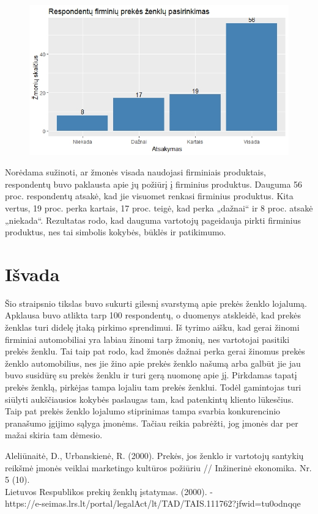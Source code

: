 \documentclass[12pt,titlepage]{article}
\begin{document}
\begin{figure}[H]
\center
\includegraphics[scale=0.8]{plot3}
\end{figure}

Norėdama sužinoti, ar žmonės visada naudojasi firminiais produktais, respondentų buvo paklausta apie jų požiūrį į firminius produktus. Dauguma 56 proc. respondentų atsakė, kad jie visuomet renkasi firminius produktus. Kita vertus, 19 proc.  perka kartais, 17 proc. teigė, kad perka „dažnai“ ir 8 proc. atsakė „niekada“.  Rezultatas rodo, kad dauguma vartotojų pageidauja pirkti firminius produktus, nes tai simbolis kokybės, būklės ir patikimumo.

\justify
\section{Išvada}
\justify
\hspace{\parindent}
Šio straipsnio tikslas buvo sukurti gilesnį svarstymą apie prekės ženklo lojalumą.  Apklausa buvo atlikta tarp 100 respondentų, o duomenys atskleidė, kad prekės ženklas turi didelę įtaką pirkimo sprendimui. Iš tyrimo aišku, kad gerai žinomi firminiai automobiliai yra labiau žinomi tarp žmonių, nes vartotojai pasitiki prekės ženklu. Tai taip pat rodo, kad žmonės dažnai perka gerai žinomus prekės ženklo automobilius, nes jie žino apie prekės ženklo našumą arba galbūt jie jau buvo susidūrę su prekės ženklu ir turi gerą nuomonę apie jį. Pirkdamas tapatį prekės ženklą, pirkėjas tampa lojaliu tam prekės ženklui. Todėl gamintojas turi siūlyti aukščiausios kokybės paslaugas tam, kad patenkintų kliento lūkesčius. Taip pat prekės ženklo lojalumo stiprinimas tampa svarbia konkurencinio pranašumo įgijimo sąlyga įmonėms. Tačiau reikia pabrėžti, jog įmonės dar per mažai skiria tam dėmesio.
\justify

\newpage
\nocite{*}	
\printbibliography[title={Literatūra}]	

Aleliūnaitė, D., Urbanskienė, R. (2000). Prekės, jos ženklo ir vartotojų santykių reikšmė įmonės veiklai marketingo kultūros požiūriu // Inžinerinė ekonomika. Nr. 5 (10).\\

Lietuvos Respublikos prekių ženklų įstatymas. (2000). - \\
https://e-seimas.lrs.lt/portal/legalAct/lt/TAD/TAIS.111762?jfwid=tu0odnqqe
\end{document}
